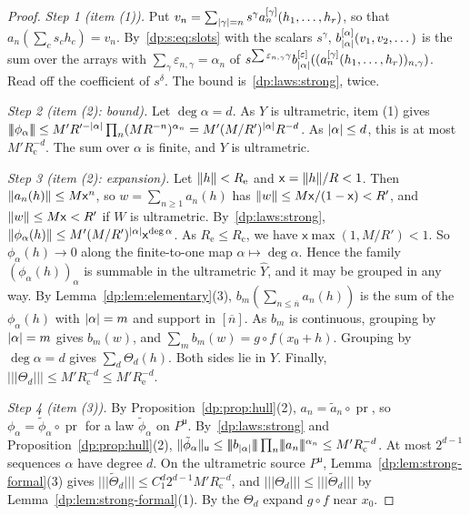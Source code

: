 \begin{proof}
\emph{Step 1 (item (1)).} Put $v_n=\sum_{\lvert \gamma\rvert=n}s^\gamma a_n^{[\gamma]}(h_1,\dots,h_r)$, so that $a_n(\sum_cs_ch_c)=v_n$. By~\eqref{dp:s:eq:slots} with the scalars $s^\gamma$, $b_{\lvert \alpha\rvert}^{[\alpha]}(v_1,v_2,\dots)$ is the sum over the arrays with $\sum_\gamma\varepsilon_{n,\gamma}=\alpha_n$ of $s^{\sum\varepsilon_{n,\gamma}\gamma}b_{\lvert \alpha\rvert}^{[\varepsilon]}((a_n^{[\gamma]}(h_1,\dots,h_r))_{n,\gamma})$. Read off the coefficient of $s^\delta$. The bound is~\eqref{dp:laws:strong}, twice.

\emph{Step 2 (item (2): bound).} Let $\deg\alpha=d$. As $Y$ is ultrametric, item (1) gives $\lvert\!\lvert\!\lvert \phi_\alpha\rvert\!\rvert\!\rvert\le M'R'^{-\lvert \alpha\rvert}\prod_n(MR^{-n})^{\alpha_n}=M'(M/R')^{\lvert \alpha\rvert}R^{-d}$. As $\lvert \alpha\rvert\le d$, this is at most $M'R_{\mathrm c}^{-d}$. The sum over $\alpha$ is finite, and $Y$ is ultrametric.

\emph{Step 3 (item (2): expansion).} Let $\lVert h\rVert<R_{\mathrm e}$ and $\mathsf x=\lVert h\rVert/R<1$. Then $\lVert a_n(h)\rVert\le M\mathsf x^n$, so $w=\sum_{n\ge1}a_n(h)$ has $\lVert w\rVert\le M\mathsf x/(1-\mathsf x)<R'$, and $\lVert w\rVert\le M\mathsf x<R'$ if $W$ is ultrametric. By~\eqref{dp:laws:strong}, $\lVert \phi_\alpha(h)\rVert\le M'(M/R')^{\lvert \alpha\rvert}\mathsf x^{\deg\alpha}$. As $R_{\mathrm e}\le R_{\mathrm c}$, we have $\mathsf x\max(1,M/R')<1$. So $\phi_\alpha(h)\to0$ along the finite-to-one map $\alpha\mapsto\deg\alpha$. Hence the family $(\phi_\alpha(h))_\alpha$ is summable in the ultrametric $\widehat Y$, and it may be grouped in any way. By Lemma~\ref{dp:lem:elementary}(3), $b_m(\sum_{n\le\overline n}a_n(h))$ is the sum of the $\phi_\alpha(h)$ with $\lvert \alpha\rvert=m$ and support in $[\overline n]$. As $b_m$ is continuous, grouping by $\lvert \alpha\rvert=m$ gives $b_m(w)$, and $\sum_mb_m(w)=g\circ f(x_0+h)$. Grouping by $\deg\alpha=d$ gives $\sum_d\Theta_d(h)$. Both sides lie in $Y$. Finally, $\lvert\!\lvert\!\lvert \Theta_d\rvert\!\rvert\!\rvert\le M'R_{\mathrm c}^{-d}\le M'R_{\mathrm e}^{-d}$.

\emph{Step 4 (item (3)).} By Proposition~\ref{dp:prop:hull}(2), $a_n=\tilde a_n\circ\operatorname{pr}$, so $\phi_\alpha=\tilde\phi_\alpha\circ\operatorname{pr}$ for a law $\tilde\phi_\alpha$ on $P^{\mathsf u}$. By~\eqref{dp:laws:strong} and Proposition~\ref{dp:prop:hull}(2), $\norm{\tilde\phi_\alpha}_{\mathsf u}\le\lvert\!\lvert\!\lvert b_{\abs\alpha}\rvert\!\rvert\!\rvert\prod_n\lvert\!\lvert\!\lvert a_n\rvert\!\rvert\!\rvert^{\alpha_n}\le M'R_{\mathrm c}^{-d}$. At most $2^{d-1}$ sequences $\alpha$ have degree $d$. On the ultrametric source $P^{\mathsf u}$, Lemma~\ref{dp:lem:strong-formal}(3) gives $\lvert\!\lvert\!\lvert \tilde\Theta_d\rvert\!\rvert\!\rvert\le C_1^d2^{d-1}M'R_{\mathrm c}^{-d}$, and $\lvert\!\lvert\!\lvert \Theta_d\rvert\!\rvert\!\rvert\le\lvert\!\lvert\!\lvert \tilde\Theta_d\rvert\!\rvert\!\rvert$ by Lemma~\ref{dp:lem:strong-formal}(1). By \cite[Lemma~Q.3]{I} the $\Theta_d$ expand $g\circ f$ near $x_0$.


\end{proof}

